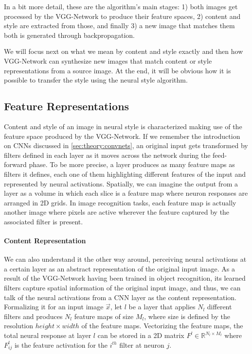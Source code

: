 In a bit more detail, these are the algorithm's main stages: 1) both images get processed by the VGG-Network to produce their feature spaces, 2) content and style are extracted from those, and finally 3) a new image that matches them both is generated through backpropagation.

We will focus next on what we mean by content and style exactly and then how VGG-Network can synthesize new images that match content or style representations from a source image.
At the end, it will be obvious how it is possible to transfer the style using the neural style algorithm.


\subsection{Feature Representations}
\label{sub:system:method:representations}

Content and style of an image in neural style is characterized making use of the feature space produced by the VGG-Network.
If we remember the introduction on CNNs discussed in \autoref{sec:theory:convnets}, an original input gets transformed by filters defined in each layer as it moves across the network during the feed-forward phase.
To be more precise, a layer produces as many feature maps as filters it defines, each one of them highlighting different features of the input and represented by neural activations.
Spatially, we can imagine the output from a layer as a volume in which each slice is a feature map where neuron responses are arranged in 2D grids.
In image recognition tasks, each feature map is actually another image where pixels are active wherever the feature captured by the associated filter is present.

\paragraph{Content Representation}
We can also understand it the other way around, perceiving neural activations at a certain layer as an abstract representation of the original input image.
As a result of the VGG-Network having been trained in object recognition, its learned filters capture spatial information of the original input image, and thus, we can talk of the neural activations from a CNN layer as the content representation.
Formalizing it for an input image $\vec{x}$, let $l$ be a layer that applies $N_l$ different filters and produces $N_l$ feature maps of size $M_l$, where size is defined by the resolution ${height}\times{width}$ of the feature maps.
Vectorizing the feature maps, the total neural response at layer $l$ can be stored in a 2D matrix $F^l \in \mathbb{R}^{{N_l}\times{M_l}}$ where $F^l_{ij}$ is the feature activation for the $i^{th}$ filter at neuron $j$.

